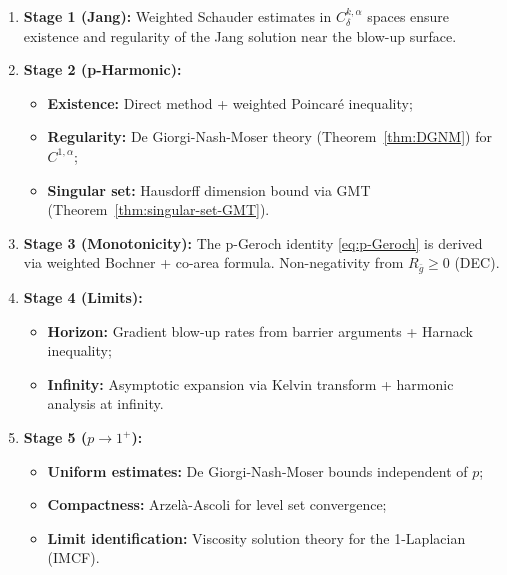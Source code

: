 \begin{remark}
\begin{enumerate}
\item \textbf{Stage 1 (Jang):} Weighted Schauder estimates in $C^{k,\alpha}_\delta$ spaces ensure existence and regularity of the Jang solution near the blow-up surface.

\item \textbf{Stage 2 (p-Harmonic):} 
\begin{itemize}
\item \textbf{Existence:} Direct method + weighted Poincar\'e inequality;
\item \textbf{Regularity:} De Giorgi-Nash-Moser theory (Theorem~\ref{thm:DGNM}) for $C^{1,\alpha}$;
\item \textbf{Singular set:} Hausdorff dimension bound via GMT (Theorem~\ref{thm:singular-set-GMT}).
\end{itemize}

\item \textbf{Stage 3 (Monotonicity):} The p-Geroch identity \eqref{eq:p-Geroch} is derived via weighted Bochner + co-area formula. Non-negativity from $R_{\bar{g}} \geq 0$ (DEC).

\item \textbf{Stage 4 (Limits):} 
\begin{itemize}
\item \textbf{Horizon:} Gradient blow-up rates from barrier arguments + Harnack inequality;
\item \textbf{Infinity:} Asymptotic expansion via Kelvin transform + harmonic analysis at infinity.
\end{itemize}

\item \textbf{Stage 5 ($p \to 1^+$):} 
\begin{itemize}
\item \textbf{Uniform estimates:} De Giorgi-Nash-Moser bounds independent of $p$;
\item \textbf{Compactness:} Arzel\`a-Ascoli for level set convergence;
\item \textbf{Limit identification:} Viscosity solution theory for the 1-Laplacian (IMCF).
\end{itemize}
\end{enumerate}
\end{remark}

